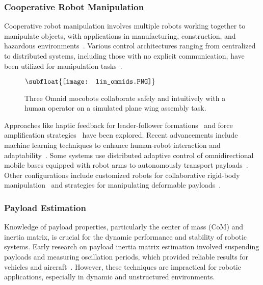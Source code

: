 \documentclass[letterpaper, 10 pt, journal, twoside]{IEEEtran}
\begin{document}
\subsubsection{Cooperative Robot Manipulation}
Cooperative robot manipulation involves multiple robots working together to manipulate objects, with applications in manufacturing, construction, and hazardous environments~\cite{caccavale2016cooperative, cherubini2016collaborative, werfel2014designing, trevelyan2016robotics}. Various control architectures ranging from centralized to distributed systems, including those with no explicit communication, have been utilized for manipulation tasks~\cite{balch1998behavior, rubenstein2014programmable, rus1995moving, liu2024self}.

\begin{figure} 
\centering
$\vcenter{\hbox{\subfloat{\texttt{[image: lin\_omnids.PNG]}}}}$
\caption{Three Omnid mocobots collaborate safely and intuitively with a human operator on a simulated plane wing assembly task.}
\label{fig:demo}
\end{figure}

Approaches like haptic feedback for leader-follower formations~\cite{sieber2015multi} and force amplification strategies~\cite{wang2016force} have been explored. Recent advancements include machine learning techniques to enhance human-robot interaction and adaptability~\cite{chi2023diffusion, zhao2023learning}. Some systems use distributed adaptive control of omnidirectional mobile bases equipped with robot arms to autonomously transport payloads~\cite{ren2020fully, carey2021collective}. Other configurations include customized robots for collaborative rigid-body manipulation~\cite{rauniyar2021mewbots} and strategies for manipulating deformable payloads~\cite{alonso2015local}. 

\subsubsection{Payload Estimation}
Knowledge of payload properties, particularly the center of mass (CoM) and inertia matrix, is crucial for the dynamic performance and stability of robotic systems. Early research on payload inertia matrix estimation involved suspending payloads and measuring oscillation periods, which provided reliable results for vehicles and aircraft~\cite{miller1930accurate, woodfield1968measurement, winkler1983inertial, winkler1983parametric, heydinger1995design}. However, these techniques are impractical for robotic applications, especially in dynamic and unstructured environments.
\end{document}
